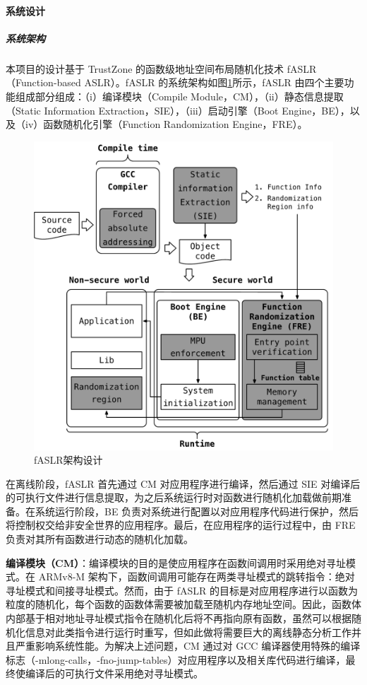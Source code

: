 \documentclass[12pt,a4paper]{ctexart}
\numberwithin{figure}{section}
\begin{document}
\paragraph{系统设计}
\subparagraph{系统架构}
\par 本项目的设计基于 TrustZone 的函数级地址空间布局随机化技术 fASLR（Function-based ASLR）。fASLR 的系统架构如图\ref{fig:alsr_architecture}所示，fASLR 由四个主要功能组成部分组成：（i）编译模块（Compile Module，CM），（ii）静态信息提取（Static Information Extraction，SIE），（iii）启动引擎（Boot Engine，BE），以及（iv）函数随机化引擎（Function Randomization Engine，FRE）。
\begin{figure}[h]
    \centering
    \includegraphics[scale=0.5]{graph/aslr_architecture.png}
    \caption{fASLR架构设计}
    \label{fig:alsr_architecture}
\end{figure}
\par 在离线阶段，fASLR 首先通过 CM 对应用程序进行编译，然后通过 SIE 对编译后的可执行文件进行信息提取，为之后系统运行时对函数进行随机化加载做前期准备。在系统运行阶段，BE 负责对系统进行配置以对应用程序代码进行保护，然后将控制权交给非安全世界的应用程序。最后，在应用程序的运行过程中，由 FRE 负责对其所有函数进行动态的随机化加载。
\par \textbf{编译模块（CM）}：编译模块的目的是使应用程序在函数间调用时采用绝对寻址模式。在 ARMv8-M 架构下，函数间调用可能存在两类寻址模式的跳转指令：绝对寻址模式和间接寻址模式。然而，由于 fASLR 的目标是对应用程序进行以函数为粒度的随机化，每个函数的函数体需要被加载至随机内存地址空间。因此，函数体内部基于相对地址寻址模式指令在随机化后将不再指向原有函数，虽然可以根据随机化信息对此类指令进行运行时重写，但如此做将需要巨大的离线静态分析工作并且严重影响系统性能。为解决上述问题，CM 通过对 GCC 编译器使用特殊的编译标志（-mlong-calls，-fno-jump-tables）对应用程序以及相关库代码进行编译，最终使编译后的可执行文件采用绝对寻址模式。
\end{document}
